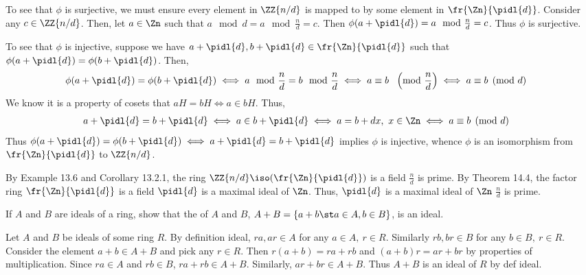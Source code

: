\documentclass{article}
\begin{document}
\begin{solution}
\begin{enumerate}[label=\tbo{\alph*.}]
\begin{subproof}[Claim 1]
\begin{subproof}[Claim 2]
        To see that \( \phi \) is surjective, we must ensure every element in \( \ZZ{n/d} \) is mapped to by some element in \( \fr{\Zn}{\pidl{d}} \).
        Consider any \( c\in\ZZ{n/d} \).
        Then, let \( a\in\Zn \) such that \( a\mod d = a\mod{\frac{n}{d}} = c \).
        Then \( \phi(a+\pidl{d}) = a\mod{\frac{n}{d}} = c \).
        Thus \( \phi \) is surjective.

        To see that \( \phi \) is injective, suppose we have \( a+\pidl{d}, b+\pidl{d}\in\fr{\Zn}{\pidl{d}} \) such that \( \phi(a+\pidl{d}) = \phi(b+\pidl{d}) \).
        Then, \begin{align*}
          \phi(a+\pidl{d}) = \phi(b+\pidl{d}) &\iff a\mod{\frac{n}{d}} = b\mod{\frac{n}{d}} \iff a \equiv b\ \,\, \left(\text{mod }\frac{n}{d}\right) \iff a \equiv b\pmod d
        \end{align*}
        We know it is a property of cosets that \( aH=bH \iff a\in bH \).
        Thus, \begin{align*}
          a+\pidl{d} = b+\pidl{d} &\iff a\in b+\pidl{d} \iff a = b+dx,\ x\in\Zn \iff a\equiv b\pmod d
        \end{align*}
        Thus \( \phi(a+\pidl{d}) = \phi(b+\pidl{d})\iff a+\pidl{d}=b+\pidl{d} \) implies \( \phi \) is injective, whence \( \phi \) is an isomorphism from \( \fr{\Zn}{\pidl{d}} \) to \( \ZZ{n/d} \).
      \end{subproof}
      By Example 13.6 and Corollary 13.2.1, the ring \( \ZZ{n/d}\iso (\fr{\Zn}{\pidl{d}}) \) is a field \iff \( \frac{n}{d} \) is prime.
      By Theorem 14.4, the factor ring \( \fr{\Zn}{\pidl{d}} \) is a field \iff \( \pidl{d} \) is a maximal ideal of \( \Zn \).
      Thus, \( \pidl{d} \) is a maximal ideal of \( \Zn \) \iff \( \frac{n}{d} \) is prime.
    \end{subproof}
\end{enumerate}
\end{solution}
\pagebreak

If \( A \) and \( B \) are ideals of a ring, show that the  of \( A \) and \( B \), \( A+B = \{a+b\st a\in A,b\in B\} \), is an ideal.

\begin{solution} %
  Let \( A \) and \( B \) be ideals of some ring \( R \). By definition ideal, \( ra,ar\in A \) for any \( a\in A,\ r\in R \). Similarly \( rb,br\in B \) for any \( b\in B,\ r\in R \). Consider the element \( a+b\in A+B \) and pick any \( r\in R \). Then \( r(a+b) = ra+rb \) and \( (a+b)r = ar+br \) by properties of multiplication. Since \( ra\in A \) and \( rb\in B \), \( ra+rb \in A+B \). Similarly, \( ar+br \in A+B \). Thus \( A+B \) is an ideal of \( R \) by def ideal.
\end{solution}
\end{document}
